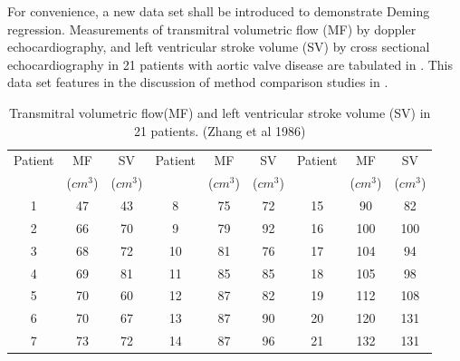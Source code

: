 \documentclass[MAIN.tex]{subfiles}
\begin{document}
	For convenience, a new data set shall be introduced to demonstrate
	Deming regression. Measurements of transmitral volumetric flow
	(MF) by doppler echocardiography, and left ventricular stroke
	volume (SV) by cross sectional echocardiography in 21 patients
	with aortic valve disease are tabulated in \citet{zhang}. This
	data set features in the discussion of method comparison studies
	in \citet[p.398]{AltmanBook} .
	
	
	\begin{table}[h!]
		\begin{center}
			\begin{tabular}{|c|c|c||c|c|c||c|c|c|}
				\hline
				Patient & MF  & SV  & Patient & MF  & SV  & Patient & MF  & SV \\
				&($cm^{3}$)&  ($cm^{3}$) & &($cm^{3}$)&  ($cm^{3}$) & &($cm^{3}$)&  ($cm^{3}$)
				\\
				\hline
				1 & 47 & 43 &  8 & 75 & 72 &  15 & 90 & 82 \\
				2 & 66 & 70 & 9 & 79 & 92 &  16 & 100 & 100 \\
				3 & 68 & 72 & 10 & 81 & 76 & 17 & 104 & 94 \\
				4 & 69 & 81 & 11 & 85 & 85 &  18 & 105 & 98 \\
				5 & 70 & 60 & 12 & 87 & 82 & 19 & 112 & 108 \\
				6 & 70 & 67 & 13 & 87 & 90 & 20 & 120 & 131 \\
				7 & 73 & 72 & 14 & 87 & 96 &  21 & 132 & 131 \\
				
				\hline
			\end{tabular}
			\caption{Transmitral volumetric flow(MF) and left ventricular
				stroke volume (SV) in 21 patients. (Zhang et al 1986)}
		\end{center}
	\end{table}
	
\end{document}
